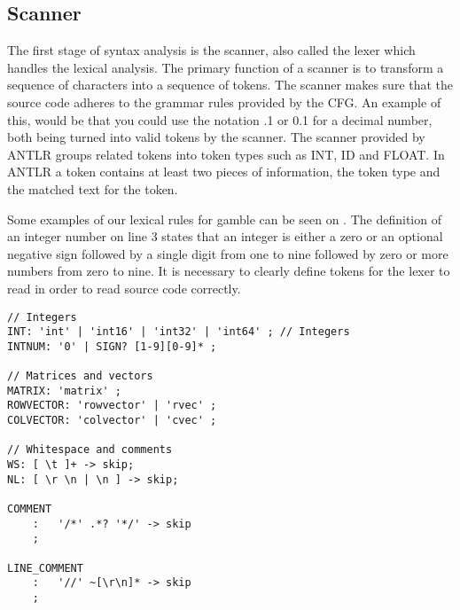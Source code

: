 \subsection{Scanner}
The first stage of syntax analysis is the scanner, also called the lexer which handles the lexical analysis.
The primary function of a scanner is to transform a sequence of characters into a sequence of tokens.
The scanner makes sure that the source code adheres to the grammar rules provided by the CFG.
An example of this, would be that you could use the notation .1 or 0.1 for a decimal number, both being turned into valid tokens by the scanner.
The scanner provided by ANTLR groups related tokens into token types such as INT, ID and FLOAT.
In ANTLR a token contains at least two pieces of information, the token type and the matched text for the token.

Some examples of our lexical rules for \gls{gamble} can be seen on .
The definition of an integer number on line 3 states that an integer is either a zero or an optional negative sign followed by a single digit from one to nine followed by zero or more numbers from zero to nine.
It is necessary to clearly define tokens for the lexer to read in order to read source code correctly. \citep{Crafting_book}

\begin{lstlisting}[caption=Example of our lexer rules for ANTLR4,frame=tlrb,label={lst:token}]
// Integers
INT: 'int' | 'int16' | 'int32' | 'int64' ; // Integers
INTNUM: '0' | SIGN? [1-9][0-9]* ;

// Matrices and vectors
MATRIX: 'matrix' ;
ROWVECTOR: 'rowvector' | 'rvec' ;
COLVECTOR: 'colvector' | 'cvec' ;  

// Whitespace and comments
WS: [ \t ]+ -> skip;
NL: [ \r \n | \n ] -> skip;

COMMENT
    :   '/*' .*? '*/' -> skip
    ;

LINE_COMMENT
    :   '//' ~[\r\n]* -> skip
    ;
\end{lstlisting}